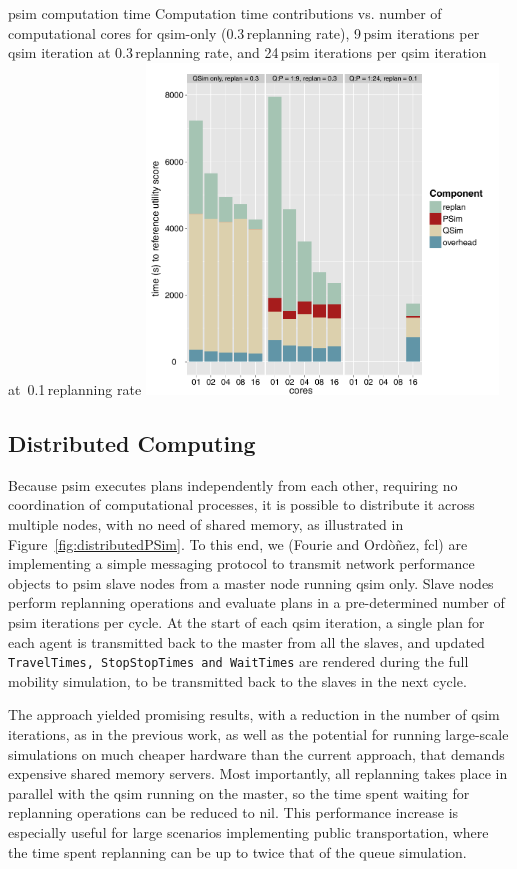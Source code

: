 \createfigure%
{\protect\gls{psim} computation time}%
{Computation time contributions vs. number of computational cores for \protect\gls{qsim}-only (0.3\,replanning rate), 9\,\gls{psim} iterations per \gls{qsim} iteration at 0.3\,replanning rate, and 24\,\gls{psim} iterations per \protect\gls{qsim} iteration at~0.1\,replanning rate}%
{\label{fig:PSimPerformance}}%
{\includegraphics[width=0.7\textwidth, angle=0]{extending/figures/PSim/times}}%
{}

\subsection{Distributed Computing}
Because \gls{psim} executes plans independently from each other, requiring no coordination of computational processes, it is possible to distribute it across multiple nodes, with no need of shared memory, as illustrated in Figure~\ref{fig:distributedPSim}. To this end, we (Fourie and Ord\`o\~nez, \gls{fcl}) are implementing a simple messaging protocol to transmit network performance objects to \gls{psim} slave nodes from a master node running \gls{qsim} only. Slave nodes perform replanning operations and evaluate plans in a pre-determined number of \gls{psim} iterations per cycle. At the start of each \gls{qsim} iteration, a single plan for each agent is transmitted back to the master from all the slaves, and updated \lstinline|TravelTimes, StopStopTimes and WaitTimes| are rendered during the full mobility simulation, to be transmitted back to the slaves in the next cycle.

The approach yielded promising results, with a reduction in the number of \gls{qsim} iterations, as in the previous work, as well as the potential for running large-scale simulations on much cheaper hardware than the current approach, that demands expensive shared memory servers. Most importantly, all replanning takes place in parallel with the \gls{qsim} running on the master, so the time spent waiting for replanning operations can be reduced to nil. This performance increase is especially useful for large scenarios implementing public transportation, where the time spent replanning can be up to twice that of the queue simulation.

